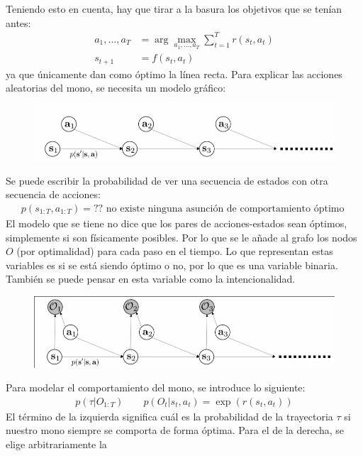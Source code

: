 Teniendo esto en cuenta, hay que tirar a la basura los objetivos que se tenían antes:
\begin{align}
    a _ { 1 } , \ldots , a _ { T } &= \operatorname { arg } \operatorname { max } _ { a _ { 1 } ,
\ldots , a _ { T } } \sum _ { t = 1 } ^ { T } r ( s _ { t } , a _ { t } )\\
        s _ { t + 1 } &= f ( s _ { t } , a _ { t } )
\end{align}
ya que únicamente dan como óptimo la línea recta. Para explicar las acciones aleatorias del mono,
se necesita un modelo gráfico:
\begin{figure}[H]
	\centering
	\includegraphics[width=0.8\linewidth]{figures/2020-07-04-175014_792x146_scrot.png}
\end{figure}
Se puede escribir la probabilidad de ver una secuencia de estados con otra secuencia de
acciones:
\begin{align}
    p ( s _ { 1 : T } , a _ { 1 : T } ) = ?? \text{ no existe ninguna asunción de
    comportamiento óptimo }
\end{align}
El modelo que se tiene no dice que los pares de acciones-estados sean óptimos, simplemente
si son físicamente posibles. Por lo que se le añade al grafo los nodos $O$ (por optimalidad)
para cada paso en el tiempo. Lo que representan estas variables es si se está siendo óptimo o
no, por lo que es una variable binaria. También se puede pensar en esta variable como la
intencionalidad.
\begin{figure}[H]
	\centering
	\includegraphics[width=0.8\linewidth]{figures/2020-07-04-175416_804x191_scrot.png}
\end{figure}
Para modelar el comportamiento del mono, se introduce lo siguiente:
\begin{align}
    \label{eq:mono}
    p(\tau|O_{1:T}) \quad\quad p(O_t|s_t,a_t)=\exp( r(s_t,a_t) )
\end{align}
El término de la izquierda significa cuál es la probabilidad de la trayectoria $\tau$
si nuestro mono siempre se comporta de forma óptima. Para el de la derecha, se elige arbitrariamente la
